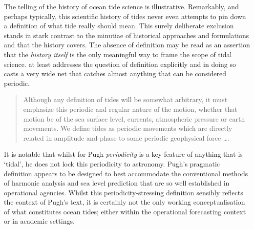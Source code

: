 The \cite{Cartwright:2000tt} telling of the history of ocean tide science is illustrative. Remarkably, and perhaps typically, this scientific history of tides never even attempts to pin down a definition of what tide really should mean.  This surely deliberate exclusion stands in stark contrast to the minutiae of historical approaches and formulations and that the history covers.  The absence of definition may be read as an assertion that the \emph{history itself} is the only meaningful way to frame the scope of tidal science.
\cite{Pugh:1996uz} at least addresses the question of definition explicitly and in doing so casts a very wide net that catches almost anything that can be considered periodic.
\begin{quote}
Although any definition of tides will be somewhat arbitrary, it must emphasize this periodic and regular nature of the motion, whether that motion be of the sea surface level, currents, atmospheric pressure or earth movements. We define tides as periodic movements which are directly related in amplitude and phase to some periodic geophysical force \ldots.
\end{quote}
It is notable that whilst for Pugh \emph{periodicity} is a key feature of anything that is `tidal', he does not lock this periodicity to astronomy.  Pugh's pragmatic definition appears to be designed to best accommodate the conventional methods of harmonic analysis and sea level prediction that are so well established in operational agencies. Whilst this periodicity-stressing definition sensibly reflects the context of Pugh's text, it is certainly not the only working conceptualisation of what constitutes ocean tides; either within the operational forecasting context or in academic settings. 

